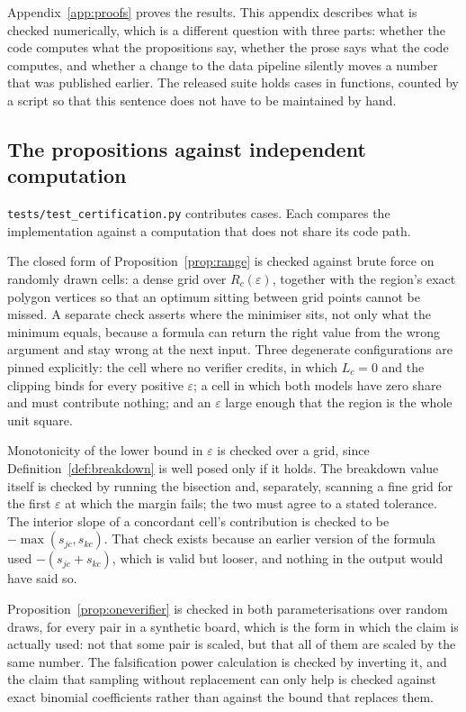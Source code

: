 Appendix~\ref{app:proofs} proves the results. This appendix describes what is checked
numerically, which is a different question with three parts: whether the code computes what
the propositions say, whether the prose says what the code computes, and whether a change to
the data pipeline silently moves a number that was published earlier. The released suite holds
\TestsTotal{} cases in \TestsFunctions{} functions, counted by a script so that this sentence
does not have to be maintained by hand.

\subsection{The propositions against independent computation}

\texttt{tests/test\_certification.py} contributes \TestsCertification{} cases. Each compares
the implementation against a computation that does not share its code path.

The closed form of Proposition~\ref{prop:range} is checked against brute force on randomly
drawn cells: a dense grid over $R_c(\varepsilon)$, together with the region's exact polygon
vertices so that an optimum sitting between grid points cannot be missed. A separate check
asserts where the minimiser sits, not only what the minimum equals, because a formula can
return the right value from the wrong argument and stay wrong at the next input. Three
degenerate configurations are pinned explicitly: the cell where no verifier credits, in which
$L_c = 0$ and the clipping binds for every positive $\varepsilon$; a cell in which both
models have zero share and must contribute nothing; and an $\varepsilon$ large enough that the
region is the whole unit square.

Monotonicity of the lower bound in $\varepsilon$ is checked over a grid, since
Definition~\ref{def:breakdown} is well posed only if it holds. The breakdown value itself is
checked by running the bisection and, separately, scanning a fine grid for the first
$\varepsilon$ at which the margin fails; the two must agree to a stated tolerance. The
interior slope of a concordant cell's contribution is checked to be
$-\max(s_{jc}, s_{kc})$. That check exists because an earlier version of the formula used
$-(s_{jc} + s_{kc})$, which is valid but looser, and nothing in the output would have said so.

Proposition~\ref{prop:oneverifier} is checked in both parameterisations over random draws,
for every pair in a synthetic board, which is the form in which the claim is actually used:
not that some pair is scaled, but that all of them are scaled by the same number. The
falsification power calculation is checked by inverting it, and the claim that sampling
without replacement can only help is checked against exact binomial coefficients rather than
against the bound that replaces them.

